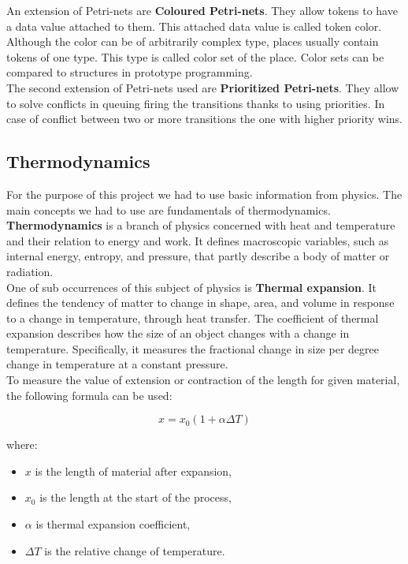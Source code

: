 \documentclass[a4paper]{article}
\begin{document}
\clearpage

An extension of Petri-nets are \textbf{Coloured Petri-nets}. They allow tokens to have a data value attached to them. This attached data value is called token color. Although the color can be of arbitrarily complex type, places usually contain tokens of one type. This type is called color set of the place. \cite{Art4} Color sets can be compared to structures in prototype programming.\\

The second extension of Petri-nets used are \textbf{Prioritized Petri-nets}. They allow to solve conflicts in queuing firing the transitions thanks to using priorities. In case of conflict between two or more transitions the one with higher priority wins.

\subsection{Thermodynamics}
\label{sec:thermodynamics}

For the purpose of this project we had to use basic information from physics. The main concepts we had to use are fundamentals of thermodynamics.\\

\textbf{Thermodynamics} is a branch of physics concerned with heat and temperature and their relation to energy and work. It defines macroscopic variables, such as internal energy, entropy, and pressure, that partly describe a body of matter or radiation. \cite{Art5}\\

One of sub occurrences of this subject of physics is \textbf{Thermal expansion}. It defines the tendency of matter to change in shape, area, and volume in response to a change in temperature, through heat transfer. The coefficient of thermal expansion describes how the size of an object changes with a change in temperature. Specifically, it measures the fractional change in size per degree change in temperature at a constant pressure. \cite{Art1}\\

To measure the value of extension or contraction of the length for given material, the following formula can be used: \cite{Art6}

\clearpage

\begin{equation}
x = x_{0} (1 + \alpha \Delta T)
\end{equation}

where:
\begin{itemize}
	\setlength{\itemsep}{1pt}
	\setlength{\parskip}{0pt}
	\setlength{\parsep}{0pt}
\item $x$ is the length of material after expansion,
\item $x_{0}$ is the length at the start of the process,
\item $\alpha$ is thermal expansion coefficient,
\item $\Delta T$ is the relative change of temperature.\\
\end{itemize}
\end{document}
